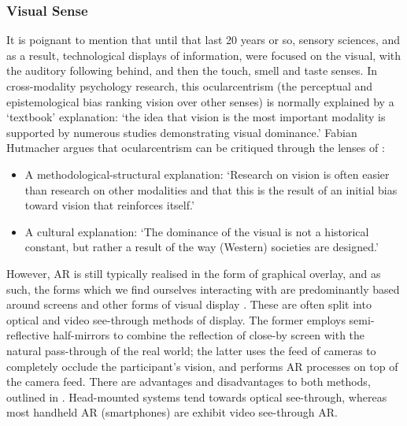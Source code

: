 \subsubsection{Visual Sense}\label{sec: literature-interface-sensory-visual}
It is poignant to mention that until that last 20 years or so, sensory sciences, and as a result, technological displays of information, were focused on the visual, with the auditory following behind, and then the touch, smell and taste senses. In cross-modality psychology research, this ocularcentrism (the perceptual and epistemological bias ranking vision over other senses) is normally explained by a `textbook' explanation: `the idea that vision is the most important modality is supported by numerous studies demonstrating visual dominance.' Fabian Hutmacher argues that ocularcentrism can be critiqued through the lenses of \citeyearpar{hutmacher2019}: 

\begin{itemize}
    \item A methodological-structural explanation: `Research on vision is often easier than research on other modalities and that this is the result of an initial bias toward vision that reinforces itself.'
    \item A cultural explanation: `The dominance of the visual is not a historical constant, but rather a result of the way (Western) societies are designed.'
\end{itemize}

However, AR is still typically realised in the form of graphical overlay, and as such, the forms which we find ourselves interacting with are predominantly based around screens and other forms of visual display \citep{dey2018}. These are often split into optical and video see-through methods of display. The former employs semi-reflective half-mirrors to combine the reflection of close-by screen with the natural pass-through of the real world; the latter uses the feed of cameras to completely occlude the participant's vision, and performs AR processes on top of the camera feed. There are advantages and disadvantages to both methods, outlined in \citep{rolland2000}. Head-mounted systems tend towards optical see-through, whereas most handheld AR (smartphones) are exhibit video see-through AR.


